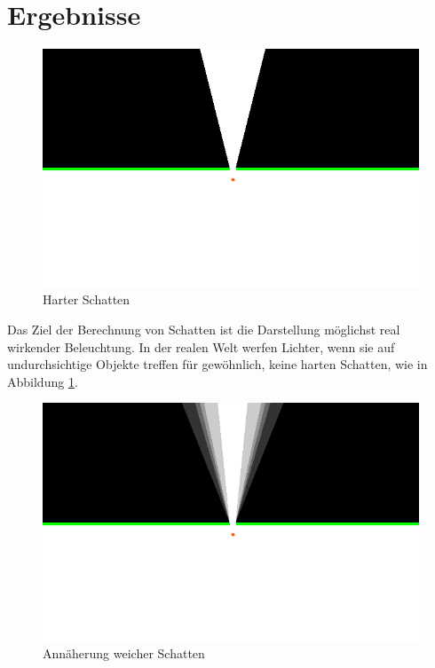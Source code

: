\section{Ergebnisse}

\begin{figure}[t]
	\centering
	\includegraphics[width=\columnwidth]{images/ergebnis_3.png}
	\caption{Harter Schatten}
	\label{fig:ergeb4}
\end{figure}

Das Ziel der Berechnung von Schatten ist die Darstellung möglichst real wirkender Beleuchtung. In der realen Welt werfen Lichter, wenn sie auf undurchsichtige Objekte treffen für gewöhnlich, keine harten Schatten, wie in Abbildung \ref{fig:ergeb4}.

\begin{figure}[t]
	\centering
	\includegraphics[width=\columnwidth]{images/ergebnis_2.png}
	\caption{Annäherung weicher Schatten}
	\label{fig:ergeb3}
\end{figure}

